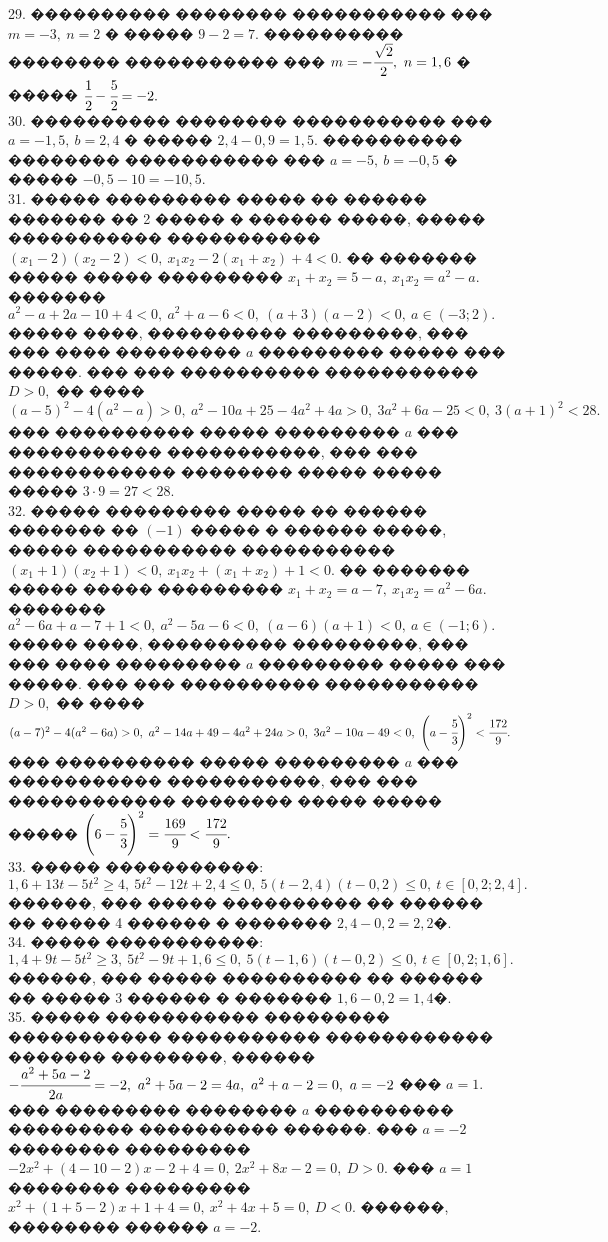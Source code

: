 \documentclass[12pt]{article}
\begin{document}
29. ���������� �������� ����������� ��� $m=-3,\ n=2$ � ����� $9-2=7.$ ���������� �������� ����������� ��� $m=-\cfrac{\sqrt{2}}{2},\ n=1,6$ � ����� $\cfrac{1}{2}-\cfrac{5}{2}=-2.$\\
30. ���������� �������� ����������� ��� $a=-1,5,\ b=2,4$ � ����� $2,4-0,9=1,5.$ ���������� �������� ����������� ��� $a=-5,\ b=-0,5$ � ����� $-0,5-10=-10,5.$\\
31. ����� ��������� ����� �� ������ ������� �� 2 ����� � ������ �����, ����� ����������� ����������� $(x_1-2)(x_2-2)<0,\ x_1x_2-2(x_1+x_2)+4<0.$ �� ������� ����� ����� ��������� $x_1+x_2=5-a,\ x_1x_2=a^2-a.$ ������� $a^2-a+2a-10+4<0,\
a^2+a-6<0,\ (a+3)(a-2)<0,\ a\in(-3;2).$ ����� ����, ���������� ���������, ��� ��� ���� ��������� $a$ ��������� ����� ��� �����. ��� ��� ���������� ����������� $D>0,$ �� ���� $(a-5)^2-4(a^2-a)>0,\ a^2-10a+25-4a^2+4a>0,\ 3a^2+6a-25<0,\ 3(a+1)^2<28.$ ��� ���������� ����� ��������� $a$ ��� ����������� �����������, ��� ��� ������������ �������� ����� ����� ����� $3\cdot9=27<28.$\\
32. ����� ��������� ����� �� ������ ������� �� $(-1)$ ����� � ������ �����, ����� ����������� ����������� $(x_1+1)(x_2+1)<0,\ x_1x_2+(x_1+x_2)+1<0.$ �� ������� ����� ����� ��������� $x_1+x_2=a-7,\ x_1x_2=a^2-6a.$ ������� $a^2-6a+a-7+1<0,\ a^2-5a-6<0,\ (a-6)(a+1)<0,\ a\in(-1;6).$ ����� ����, ���������� ���������, ��� ��� ���� ��������� $a$ ��������� ����� ��� �����. ��� ��� ���������� ����������� $D>0,$ �� ���� $(a-7)^2-4(a^2-6a)>0,\ a^2-14a+49-4a^2+24a>0,\ 3a^2-10a-49<0,\ \left(a-\cfrac{5}{3}\right)^2<\cfrac{172}{9}.$ ��� ���������� ����� ��������� $a$ ��� ����������� �����������, ��� ��� ������������ �������� ����� ����� ����� $\left(6-\cfrac{5}{3}\right)^2=\cfrac{169}{9}<\cfrac{172}{9}.$\\
33. ����� �����������: $1,6+13t-5t^2\geqslant4,\ 5t^2-12t+2,4\leqslant0,\ 5(t-2,4)(t-0,2)\leqslant0,\ t\in[0,2;2,4].$ ������, ��� ����� ���������� �� ������ �� ����� 4 ������ � ������� $2,4-0,2=2,2$�.\\
34. ����� �����������: $1,4+9t-5t^2\geqslant3,\ 5t^2-9t+1,6\leqslant0,\ 5(t-1,6)(t-0,2)\leqslant0,\ t\in[0,2;1,6].$ ������, ��� ����� ���������� �� ������ �� ����� 3 ������ � ������� $1,6-0,2=1,4$�.\\
35. ����� ����������� ��������� ����������� ����������� ������������ ������� ��������, ������ $-\cfrac{a^2+5a-2}{2a}=-2,\ a^2+5a-2=4a,\ a^2+a-2=0,\ a=-2$ ��� $a=1.$ ��� ��������� �������� $a$ ���������� ��������� ���������� ������. ��� $a=-2$ �������� ��������� $-2x^2+(4-10-2)x-2+4=0,\ 2x^2+8x-2=0,\ D>0.$ ��� $a=1$ �������� ��������� $x^2+(1+5-2)x+1+4=0,\ x^2+4x+5=0,\ D<0.$ ������, �������� ������ $a=-2.$\\
\end{document}
